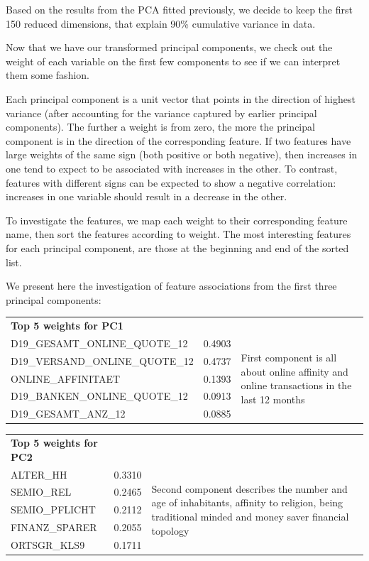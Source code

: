 Based on the results from the PCA fitted previously, we decide to keep the first 150 reduced dimensions, that explain 90\% cumulative variance in data.

Now that we have our transformed principal components, we check out the weight of each variable on the first few components to see if we can interpret them some fashion.

Each principal component is a unit vector that points in the direction of highest variance (after accounting for the variance captured by earlier principal components). The further a weight is from zero, the more the principal component is in the direction of the corresponding feature. If two features have large weights of the same sign (both positive or both negative), then increases in one tend to expect to be associated with increases in the other. To contrast, features with different signs can be expected to show a negative correlation: increases in one variable should result in a decrease in the other.

To investigate the features, we map each weight to their corresponding feature name, then sort the features according to weight. The most interesting features for each principal component, are those at the beginning and end of the sorted list. 

We present here the investigation of feature associations from the first three principal components:

\begin{tabular}{lll}
    \textbf{Top 5 weights for PC1} \\
    D19\_GESAMT\_ONLINE\_QUOTE\_12 & 0.4903 & \multirow{5}{20em}{First component is all about online affinity and online transactions in the last 12 months} \\
    D19\_VERSAND\_ONLINE\_QUOTE\_12 & 0.4737 \\
    ONLINE\_AFFINITAET & 0.1393 \\
    D19\_BANKEN\_ONLINE\_QUOTE\_12 & 0.0913 \\
    D19\_GESAMT\_ANZ\_12 & 0.0885 \\
\end{tabular}

\begin{tabular}{lll}
    \textbf{Top 5 weights for PC2} \\
    ALTER\_HH & 0.3310 & \multirow{5}{25em}{Second component describes the number and age of inhabitants, affinity to religion, being traditional minded and money saver financial topology} \\
    SEMIO\_REL & 0.2465 \\
    SEMIO\_PFLICHT & 0.2112 \\
    FINANZ\_SPARER & 0.2055 \\
    ORTSGR\_KLS9 & 0.1711 \\
\end{tabular}

